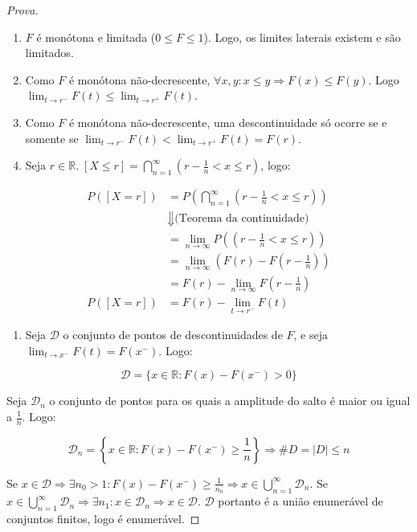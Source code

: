 \documentclass[
]{article}
\providecommand{\tightlist}{%
  \setlength{\itemsep}{0pt}\setlength{\parskip}{0pt}}
\theoremstyle{definition}
\theoremstyle{definition}
\theoremstyle{definition}
\theoremstyle{definition}
\theoremstyle{remark}
\begin{document}
\begin{proof}[Prova]
\leavevmode

\begin{enumerate}
\def\labelenumi{\alph{enumi})}
\item
  \(F\) é monótona e limitada (\(0 \le F \le 1\)). Logo, os limites laterais existem e são limitados.
\item
  Como \(F\) é monótona não-decrescente, \(\forall x,y : x \le y \Rightarrow F(x) \le F(y)\). Logo \(\lim_{t \to r^{-}}F(t) \le \lim_{t \to r^{+}}F(t)\).
\item
  Como \(F\) é monótona não-decrescente, uma descontinuidade só ocorre se e somente se \(\lim_{t \to r^{-}}F(t) < \lim_{t \to r^{+}}F(t) = F(r)\).
\item
  Seja \(r \in \mathbb{R}. \; [X \le r] = \bigcap_{n=1}^{\infty}(r-\frac{1}{n} < x \le r)\), logo:
\end{enumerate}

\begin{align*}
P([X = r]) &= P\left(\bigcap_{n=1}^{\infty}\left(r-\frac{1}{n} < x \le r\right)\right) \\
&\Downarrow \text{(Teorema da continuidade)} \\
&=\lim_{n \to \infty}P\left(\left(r - \frac{1}{n} < x \le r\right)\right) \\
&= \lim_{n \to \infty} \left(F(r) - F\left(r - \frac{1}{n}\right)\right) \\
&= F(r) - \lim_{n \to \infty}F\left(r - \frac{1}{n}\right) \\
P([X = r]) &= F(r) - \lim_{t \to r^{-}}F(t)
\end{align*}

\begin{enumerate}
\def\labelenumi{\alph{enumi})}
\setcounter{enumi}{4}
\tightlist
\item
  Seja \(\mathcal{D}\) o conjunto de pontos de descontinuidades de \(F\), e seja \(\lim_{t \to x^{-}}F(t) = F(x^{-})\). Logo:
\end{enumerate}

\begin{equation*}
\mathcal{D} = \{x \in \mathbb{R} : F(x) - F(x^{-}) > 0\}
\end{equation*}

Seja \(\mathcal{D}_{n}\) o conjunto de pontos para os quais a amplitude do salto é maior ou igual a \(\frac{1}{n}\). Logo:

\begin{equation*}
\mathcal{D}_{n} = \left\{x \in \mathbb{R}: F(x) - F(x^{-}) \ge \frac{1}{n}\right\} \Rightarrow \# D = |D| \le n
\end{equation*}

Se \(x \in \mathcal{D} \Rightarrow \exists n_{0} > 1 : F(x) - F(x^{-}) \ge \frac{1}{n_{0}} \Rightarrow x \in \bigcup_{n=1}^{\infty}\mathcal{D}_{n}\). Se \(x \in \bigcup_{n=1}^{\infty}\mathcal{D}_{n} \Rightarrow \exists n_{1} : x \in \mathcal{D}_{n} \Rightarrow x \in \mathcal{D}\). \(\mathcal{D}\) portanto é a união enumerável de conjuntos finitos, logo é enumerável.

\end{proof}
\end{document}
